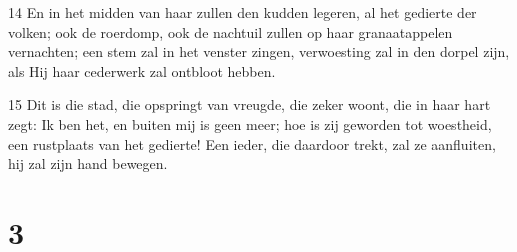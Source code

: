 \par 14 En in het midden van haar zullen den kudden legeren, al het gedierte der volken; ook de roerdomp, ook de nachtuil zullen op haar granaatappelen vernachten; een stem zal in het venster zingen, verwoesting zal in den dorpel zijn, als Hij haar cederwerk zal ontbloot hebben.
\par 15 Dit is die stad, die opspringt van vreugde, die zeker woont, die in haar hart zegt: Ik ben het, en buiten mij is geen meer; hoe is zij geworden tot woestheid, een rustplaats van het gedierte! Een ieder, die daardoor trekt, zal ze aanfluiten, hij zal zijn hand bewegen.

\chapter{3}

